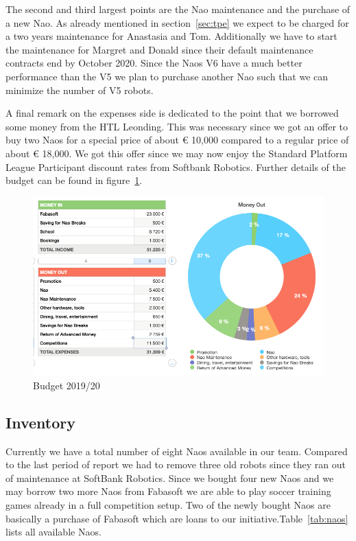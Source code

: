\documentclass[11pt]{article}
\begin{document}
The second and third largest points are the Nao maintenance and the purchase of a new Nao. As already mentioned in section~\ref{sec:tpe} we expect to be charged for a two years maintenance for Anastasia and Tom. Additionally we have to start the maintenance for Margret and Donald since their default maintenance contracts end by October 2020. Since the Naos V6 have a much better performance than the V5 we plan to purchase another Nao such that we can minimize the number of V5 robots. 

A final remark on the expenses side is dedicated to the point that we borrowed some money from the HTL Leonding. This was necessary since we got an offer to buy two Naos for a special price of about € 10,000 compared to a regular price of about € 18,000. We got this offer since we may now enjoy the Standard Platform League Participant discount rates from Softbank Robotics. Further details of the budget can be found in figure~\ref{fig:budget}.
\begin{figure}
\begin{center}
\includegraphics[scale=0.5]{img/budget.png}
\end{center}
\caption{Budget 2019/20}
\label{fig:budget}
\end{figure}

\subsection{Inventory}
Currently we have a total number of eight Naos available in our team. Compared to the last period of report we had to remove three old robots since they ran out of maintenance at SoftBank Robotics. Since we bought four new Naos and we may borrow two more Naos from Fabasoft we are able to play soccer training games already in a full competition setup. Two of the newly bought Naos are basically a purchase of Fabasoft which are loans to our initiative.Table~\ref{tab:naos} lists all available Naos.
\end{document}
